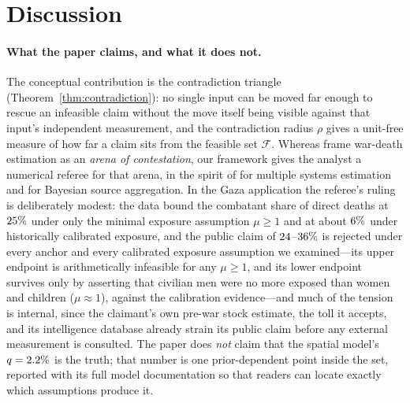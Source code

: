 \section{Discussion}\label{sec:discussion}

\paragraph{What the paper claims, and what it does not.} The conceptual contribution is the contradiction triangle (Theorem~\ref{thm:contradiction}): no single input can be moved far enough to rescue an infeasible claim without the move itself being visible against that input's independent measurement, and the contradiction radius $\rho$ gives a unit-free measure of how far a claim sits from the feasible set $\mathcal F$. Whereas \citet{spagat2009} frame war-death estimation as an \emph{arena of contestation}, our framework gives the analyst a numerical referee for that arena, in the spirit of \citet{lumpricebanks2013} for multiple systems estimation and \citet{radford2023} for Bayesian source aggregation. In the Gaza application the referee's ruling is deliberately modest: the data bound the combatant share of direct deaths at $25{}\%$ under only the minimal exposure assumption $\mu\ge 1$ and at about $6{}\%$ under historically calibrated exposure, and the public claim of $24{}$--$36{}\%$ is rejected under every anchor and every calibrated exposure assumption we examined---its upper endpoint is arithmetically infeasible for any $\mu\ge 1$, and its lower endpoint survives only by asserting that civilian men were no more exposed than women and children ($\mu\approx 1$), against the calibration evidence---and much of the tension is internal, since the claimant's own pre-war stock estimate, the toll it accepts, and its intelligence database already strain its public claim before any external measurement is consulted. The paper does \emph{not} claim that the spatial model's $q=2.2{}\%$ is the truth; that number is one prior-dependent point inside the set, reported with its full model documentation so that readers can locate exactly which assumptions produce it.

